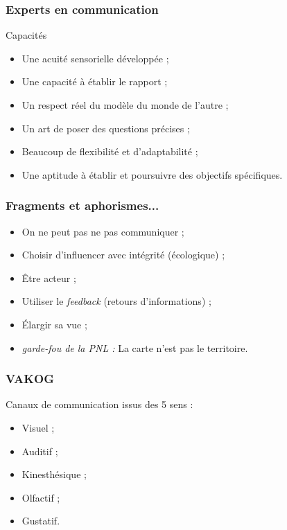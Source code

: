 \documentclass{beamer}
\begin{document}
\begin{frame}
\frametitle{Experts en communication}
	\begin{block}{Capacités}
		\begin{itemize}
			\item Une acuité sensorielle développée ;
			\item Une capacité à établir le rapport ;
			\item Un respect réel du modèle du monde de l'autre ;
			\item Un art de poser des questions précises ;
			\item Beaucoup de flexibilité et d'adaptabilité ;
			\item Une aptitude à établir et poursuivre des objectifs spécifiques.
		\end{itemize}
	\end{block}
\end{frame}

\begin{frame}
\frametitle{Fragments et aphorismes...}
	\begin{itemize}
		\item On ne peut pas ne pas communiquer ;
		\item Choisir d'influencer avec intégrité (écologique) ;
		\item Être acteur ;
		\item Utiliser le \emph{feedback} (retours d'informations) ;
		\item Élargir sa vue ;
		\item \emph{garde-fou de la PNL :} La carte n'est pas le territoire.
	\end{itemize}
\end{frame}

\begin{frame}
\frametitle{VAKOG}
	Canaux de communication issus des 5 sens :
	\begin{itemize}
		\item Visuel ;
		\item Auditif ;
		\item Kinesthésique ;
		\item Olfactif ;
		\item Gustatif.  
	\end{itemize}
\end{frame}
\end{document}
